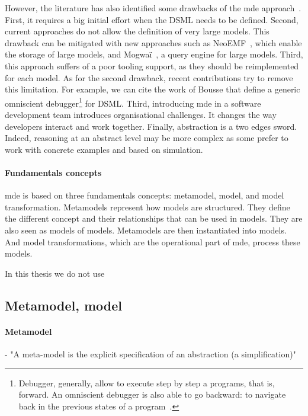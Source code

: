 However, the literature has also identified some drawbacks of the \gls{mde} approach~\cite{DBLP:conf/ifm/Kent02, DBLP:conf/uml/BakerLW05, DBLP:conf/models/WhittleHRBH13, DBLP:conf/icse/HutchinsonRW11}.
First, it requires a big initial effort when the DSML needs to be defined.
Second, current approaches do not allow the definition of very large models.
This drawback can be mitigated with new approaches such as NeoEMF~\cite{DBLP:conf/ecmdafa/BenelallamGSTL14, DBLP:journals/scp/DanielSBTVGC17}, which enable the storage of large models,  and Mogwaï~\cite{DBLP:conf/rcis/DanielSC16}, a query engine for large models.
Third, this approach suffers of a poor tooling support, as they should be reimplemented for each model.
As for the second drawback, recent contributions try to remove this limitation.
For example, we can cite the work of Bousse \etal \cite{DBLP:journals/jss/BousseLCWB18} that define a generic omniscient debugger\footnote{Debugger, generally, allow to execute step by step a programs, that is, forward. An omniscient debugger is also able to go backward: to navigate back in the previous states of a program~\cite{DBLP:journals/corr/cs-SE-0310016}.} for DSML.
Third, introducing \gls{mde} in a software development team introduces organisational challenges.
It changes the way developers interact and work together.
Finally, abstraction is a two edges sword.
Indeed, reasoning at an abstract level may be more complex as some prefer to work with concrete examples and based on simulation.

\paragraph{Fundamentals concepts}
\gls{mde} is based on three fundamentals concepts: metamodel, model, and model transformation.
Metamodels represent how models are structured.
They define the different concept and their relationships that can be used in models.
They are also seen as models of models.
Metamodels are then instantiated into models.
And model transformations, which are the operational part of \gls{mde}, process these models.

In this thesis we do not use 


\subsection{Metamodel, model}

\paragraph{Metamodel}
 - "A  meta-model  is  the  explicit  specification  of  an  abstraction (a simplification)" \cite{DBLP:conf/kbse/BezivinG01}
  
